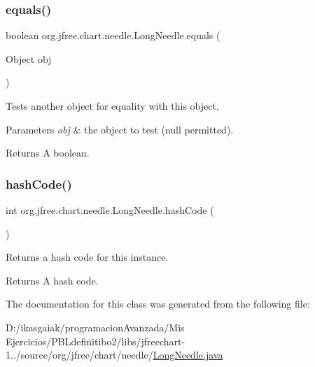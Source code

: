 \subsubsection{\texorpdfstring{equals()}{equals()}}
{\footnotesize\ttfamily boolean org.\+jfree.\+chart.\+needle.\+Long\+Needle.\+equals (\begin{DoxyParamCaption}\item[{Object}]{obj }\end{DoxyParamCaption})}

Tests another object for equality with this object.


\begin{DoxyParams}{Parameters}
{\em obj} & the object to test ({\ttfamily null} permitted).\\
\hline
\end{DoxyParams}
\begin{DoxyReturn}{Returns}
A boolean. 
\end{DoxyReturn}
\mbox{\label{classorg_1_1jfree_1_1chart_1_1needle_1_1_long_needle_aa12f79a67f17b0413ae5a1d9179386d8}} 
\subsubsection{\texorpdfstring{hash\+Code()}{hashCode()}}
{\footnotesize\ttfamily int org.\+jfree.\+chart.\+needle.\+Long\+Needle.\+hash\+Code (\begin{DoxyParamCaption}{ }\end{DoxyParamCaption})}

Returns a hash code for this instance.

\begin{DoxyReturn}{Returns}
A hash code. 
\end{DoxyReturn}


The documentation for this class was generated from the following file\+:\begin{DoxyCompactItemize}
\item 
D\+:/ikasgaiak/programacion\+Avanzada/\+Mis Ejercicios/\+P\+B\+Ldefinitibo2/libs/jfreechart-\/1../source/org/jfree/chart/needle/\mbox{\hyperlink{_long_needle_8java}{Long\+Needle.\+java}}\end{DoxyCompactItemize}
